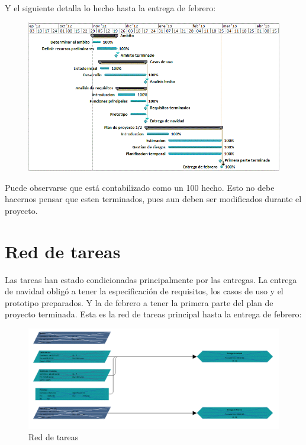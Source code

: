 \documentclass[spanish,a4paper,12pt]{report}	%
\begin{document}
	Y el siguiente detalla lo hecho hasta la entrega de febrero:

	\begin{figure}[!h]
	\centering
	\includegraphics[scale=0.8]{GraficoGanttDetallado.png}
	\end{figure}

	Puede observarse que está contabilizado como un 100 hecho. Esto no debe hacernos pensar que esten terminados,
	pues aun deben ser modificados durante el proyecto.

	\newpage

	\section{Red de tareas}

	Las tareas han estado condicionadas principalmente por las entregas. La entrega de navidad obligó a tener la especificación de requisitos,  los casos de uso y el prototipo preparados.
	 Y la de febrero a tener la primera parte del plan de proyecto terminada. Esta es la red de tareas principal hasta la entrega de febrero:

	\begin{figure}[!h]
	\centering
	\includegraphics[scale=0.56]{RedTareas.png}
	\caption{Red de tareas}
	\end{figure}
\end{document}
